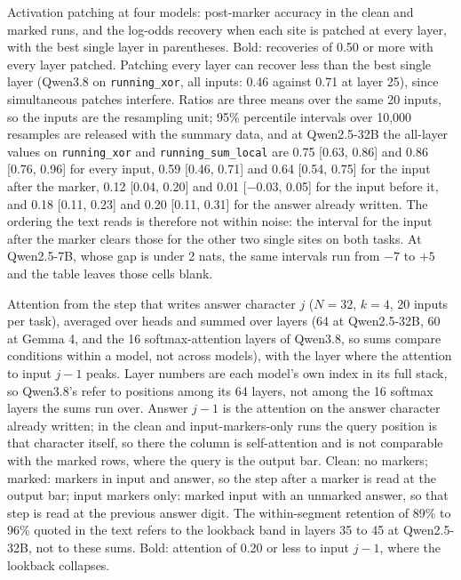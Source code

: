 \documentclass[10pt]{article} %
\newcommand{\task}[1]{\texttt{#1}}
\begin{document}
\begin{table}[!htbp]
\centering
\small
\caption{Activation patching at four models: post-marker accuracy in the clean and marked runs, and the log-odds recovery when each site is patched at every layer, with the best single layer in parentheses. Bold: recoveries of 0.50 or more with every layer patched. Patching every layer can recover less than the best single layer (Qwen3.8 on \task{running\_xor}, all inputs: 0.46 against 0.71 at layer 25), since simultaneous patches interfere. Ratios are three means over the same 20 inputs, so the inputs are the resampling unit; 95\% percentile intervals over 10,000 resamples are released with the summary data, and at Qwen2.5-32B the all-layer values on \task{running\_xor} and \task{running\_sum\_local} are 0.75 [0.63, 0.86] and 0.86 [0.76, 0.96] for every input, 0.59 [0.46, 0.71] and 0.64 [0.54, 0.75] for the input after the marker, 0.12 [0.04, 0.20] and 0.01 [$-0.03$, 0.05] for the input before it, and 0.18 [0.11, 0.23] and 0.20 [0.11, 0.31] for the answer already written. The ordering the text reads is therefore not within noise: the interval for the input after the marker clears those for the other two single sites on both tasks. At Qwen2.5-7B, whose gap is under 2 nats, the same intervals run from $-7$ to $+5$ and the table leaves those cells blank.}
\label{tab:patching}
\resizebox{\linewidth}{!}{}
\end{table}

\begin{table}[!htbp]
\centering
\small
\caption{Attention from the step that writes answer character $j$ ($N = 32$, $k = 4$, 20 inputs per task), averaged over heads and summed over layers (64 at Qwen2.5-32B, 60 at Gemma 4, and the 16 softmax-attention layers of Qwen3.8, so sums compare conditions within a model, not across models), with the layer where the attention to input $j-1$ peaks. Layer numbers are each model's own index in its full stack, so Qwen3.8's refer to positions among its 64 layers, not among the 16 softmax layers the sums run over. Answer $j-1$ is the attention on the answer character already written; in the clean and input-markers-only runs the query position is that character itself, so there the column is self-attention and is not comparable with the marked rows, where the query is the output bar. Clean: no markers; marked: markers in input and answer, so the step after a marker is read at the output bar; input markers only: marked input with an unmarked answer, so that step is read at the previous answer digit. The within-segment retention of 89\% to 96\% quoted in the text refers to the lookback band in layers 35 to 45 at Qwen2.5-32B, not to these sums. Bold: attention of 0.20 or less to input $j-1$, where the lookback collapses.}
\label{tab:attention}
\resizebox{\linewidth}{!}{}
\end{table}
\end{document}
